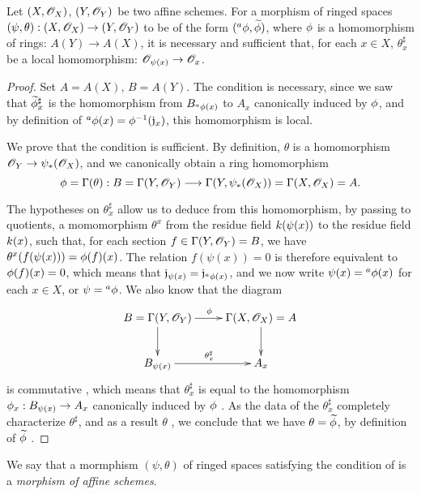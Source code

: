 \begin{thm}[1.7.3]
\label{1.1.7.3}
Let $(X,\mathscr{O}_X)$, $(Y,\mathscr{O}_Y)$ be two affine schemes. For a morphism of ringed spaces
$(\psi,\theta):(X,\mathscr{O}_X)\to(Y,\mathscr{O}_Y)$ to be of the form $({}^a\phi,\widetilde{\phi})$,
where $\phi$ is a homomorphism of rings: $A(Y)\to A(X)$, it is necessary and sufficient
that, for each $x\in X$, $\theta_x^\sharp$ be a local homomorphism: $\mathscr{O}_{\psi(x)}\to\mathscr{O}_x$.
\end{thm}

\begin{proof}
\label{proof-1.1.7.3}
Set $A=A(X)$, $B=A(Y)$. The condition is necessary, since we saw  that
$\widetilde{\phi}_x^\sharp$ is the homomorphism from $B_{{}^a\phi(x)}$ to $A_x$ canonically
induced by $\phi$, and by definition of ${}^a\phi(x)=\phi^{-1}(\mathfrak{j}_x)$, this
homomorphism is local.

We prove that the condition is sufficient. By definition, $\theta$ is a homomorphism
$\mathscr{O}_Y\to\psi_*(\mathscr{O}_X)$, and we canonically obtain a ring homomorphism
\[
  \phi=\Gamma(\theta):B=\Gamma(Y,\mathscr{O}_Y)
  \longrightarrow\Gamma(Y,\psi_*(\mathscr{O}_X))=\Gamma(X,\mathscr{O}_X)=A.
\]

The hypotheses on $\theta_x^\sharp$ allow us to deduce from this homomorphism, by passing to
quotients, a momomorphism $\theta^x$ from the residue field $k(\psi(x))$ to the residue
field $k(x)$, such that, for each section $f\in\Gamma(Y,\mathscr{O}_Y)=B$, we have
$\theta^x(f(\psi(x)))=\phi(f)(x)$. The relation $f(\psi(x))=0$ is therefore equivalent to
$\phi(f)(x)=0$, which means that $\mathfrak{j}_{\psi(x)}=\mathfrak{j}_{{}^a\phi(x)}$, and
we now write $\psi(x)={}^a\phi(x)$ for each $x\in X$, or $\psi={}^a\phi$. We also know that
the diagram
\[
  \xymatrix{
    B=\Gamma(Y,\OO_Y)\ar[r]^\vphi\ar[d] &
    \Gamma(X,\OO_X)=A\ar[d]\\
    B_{\psi(x)}\ar[r]^{\theta_x^\sharp} &
    A_x
  }
\]
is commutative , which means that $\theta_x^\sharp$ is equal to the
homomorphism $\phi_x:B_{\psi(x)}\to A_x$ canonically induced by $\phi$ .
As the data of the $\theta_x^\sharp$ completely characterize $\theta^\sharp$, and as a result
$\theta$ , we conclude that we have $\theta=\widetilde{\phi}$, by
definition of $\widetilde{\phi}$ .
\end{proof}

We say that a mormphism $(\psi,\theta)$ of ringed spaces satisfying the condition of
 is a \emph{morphism of affine schemes}.

